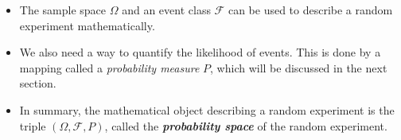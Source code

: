 \begin{itemize}
\item The sample space $\Omega$ and an event class $\mathcal{F}$ can be used to describe a random experiment mathematically.
\item We also need a way to quantify the likelihood of events. This is done by a mapping called a \textit{probability measure} $P$, which will be discussed in the next section.
\item In summary, the mathematical object describing a random experiment is the triple
$(\Omega,\mathcal{F},P)$,
called the \textit{\textbf{probability space}} of the random experiment.
\end{itemize}